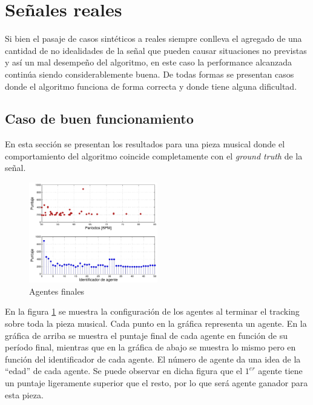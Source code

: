 \documentclass[12pt,a4paper,titlepage]{report}
\begin{document}
\section{Señales reales}

Si bien el pasaje de casos sintéticos a reales siempre conlleva el agregado de una cantidad de no idealidades de la señal que pueden causar situaciones no previstas y así un mal desempeño del algoritmo, en este caso la performance alcanzada continúa siendo considerablemente buena. De todas formas se presentan casos donde el algoritmo funciona de forma correcta y donde tiene alguna dificultad.

\subsection{Caso de buen funcionamiento}

En esta sección se presentan los resultados para una pieza musical donde el comportamiento del algoritmo coincide completamente con el \emph{ground truth} de la señal.\\

\begin{figure}
	\vspace{-25pt}
	\begin{center}
	\includegraphics[width=0.5\textwidth]{./pics/datos_2_2_A_agents.pdf}
	\end{center}
	\vspace{-20pt}
	\caption{Agentes finales}
	\label{fig:datos_2_2_A_agents}
\end{figure}

En la figura \ref{fig:datos_2_2_A_agents} se muestra la configuración de los agentes al terminar el tracking sobre toda la pieza musical. Cada punto en la gráfica representa un agente. En la gráfica de arriba se muestra el puntaje final de cada agente en función de su período final, mientras que en la gráfica de abajo se muestra lo mismo pero en función del identificador de cada agente. El número de agente da una idea de la ``edad'' de cada agente. Se puede observar en dicha figura que el $1^{er}$ agente tiene un puntaje ligeramente superior que el resto, por lo que será agente ganador para esta pieza.\\
\end{document}
